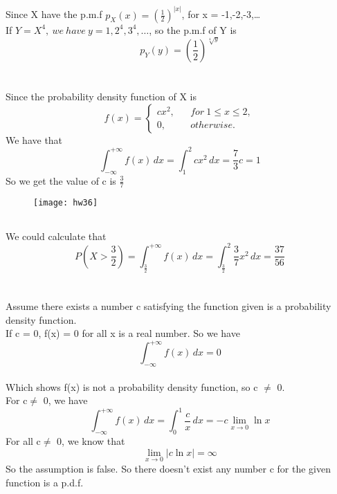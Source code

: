 \documentclass[10.5pt]{article}
\begin{document}
\section{}
Since X have the p.m.f $p_X(x) = \left(\frac{1}{2}\right)^{\left\lvert x \right\rvert} $, for x = -1,-2,-3,\dots\\\indent
If $Y = X^4, ~we~have~y = 1,2^4,3^4,\dots$, so the p.m.f of Y is $$p_Y(y) = \left(\frac{1}{2}\right)^{\sqrt[4]{y}}$$

\section{}
\subsection{}
Since the probability density function of X is $$f(x) = \left\{
    \begin{array}{rcl}
        cx^2, & & for~1\leqslant x\leqslant 2,\\
        0, & & otherwise. 
    \end{array}\right.$$\indent
We have that$$\int_{-\infty}^{+\infty} f(x) \,dx = \int_{1}^{2} cx^2 \,dx = \frac{7}{3}c = 1$$\indent
So we get the value of c is $\frac{3}{7}$\\\indent
\begin{figure}[h]
\texttt{[image: hw36]}
\end{figure}
\subsection{}
We could calculate that $$P(X > \frac{3}{2}) = \int_{\frac{3}{2}}^{+\infty} f(x) \,dx = \int_{\frac{3}{2}}^{2} \frac{3}{7}x^2 \,dx = \frac{37}{56}$$

\section{}
Assume there exists a number c satisfying the function given is a probability density function.\\\indent
If c = 0, f(x) = 0 for all x is a real number. So we have $$\int_{-\infty}^{+\infty} f(x) \,dx = 0$$ \\\indent
Which shows f(x) is not a probability density function, so c $\neq$ 0.\\\indent
For c$\neq$ 0, we have $$\int_{-\infty}^{+\infty} f(x) \,dx = \int_{0}^{1} \frac{c}{x} \,dx = -c\lim_{x \to 0} \ln x $$\indent
For all c$\neq$ 0, we know that $$\lim_{x \to 0}  \left\lvert c \ln x \right\rvert = \infty$$\indent
So the assumption is false. So there doesn't exist any number c for the given function is a p.d.f.
\end{document}
